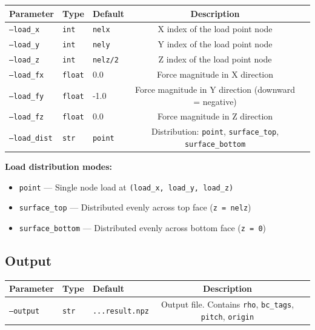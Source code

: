 \documentclass[11pt,a4paper]{article}
\begin{document}
\begin{table}[h]
\centering
\begin{tabularx}{\textwidth}{lllcX}
\toprule
\textbf{Parameter} & \textbf{Type} & \textbf{Default} & \textbf{Description} \\
\midrule
\texttt{--load\_x} & \texttt{int} & \texttt{nelx} & X index of the load point node \\
\texttt{--load\_y} & \texttt{int} & \texttt{nely} & Y index of the load point node \\
\texttt{--load\_z} & \texttt{int} & \texttt{nelz/2} & Z index of the load point node \\
\texttt{--load\_fx} & \texttt{float} & 0.0 & Force magnitude in X direction \\
\texttt{--load\_fy} & \texttt{float} & -1.0 & Force magnitude in Y direction (downward = negative) \\
\texttt{--load\_fz} & \texttt{float} & 0.0 & Force magnitude in Z direction \\
\texttt{--load\_dist} & \texttt{str} & \texttt{point} & Distribution: \texttt{point}, \texttt{surface\_top}, \texttt{surface\_bottom} \\
\bottomrule
\end{tabularx}
\end{table}

\noindent \textbf{Load distribution modes:}
\begin{itemize}[label=--]
    \item \texttt{point} — Single node load at \texttt{(load\_x, load\_y, load\_z)}
    \item \texttt{surface\_top} — Distributed evenly across top face (\texttt{z = nelz})
    \item \texttt{surface\_bottom} — Distributed evenly across bottom face (\texttt{z = 0})
\end{itemize}

\subsection{Output}

\begin{table}[h]
\centering
\begin{tabularx}{\textwidth}{lllcX}
\toprule
\textbf{Parameter} & \textbf{Type} & \textbf{Default} & \textbf{Description} \\
\midrule
\texttt{--output} & \texttt{str} & \texttt{...result.npz} & Output file. Contains \texttt{rho}, \texttt{bc\_tags}, \texttt{pitch}, \texttt{origin} \\
\bottomrule
\end{tabularx}
\end{table}
\end{document}
